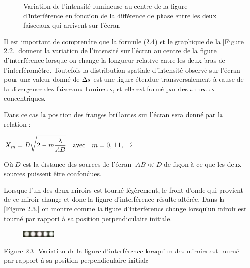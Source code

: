 \documentclass[11pt, openright]{book}
\begin{document}
					\begin{figure}[ht!]
						\centering
						\caption{Variation de l'intensité lumineuse au centre de la figure d'interférence en fonction de la différence de phase entre les deux faisceaux qui arrivent sur l'écran}

					\end{figure}

					Il est important de comprendre que la formule (2.4) et le graphique de la [Figure 2.2.] donnent la variation de l'intensité sur l'écran au centre de la figure d'interférence lorsque on change la longueur relative entre les deux bras de l'interféromètre. Toutefois la distribution spatiale d'intensité observé sur l'écran pour une valeur donné de $\displaystyle{\Delta s}$ est une figure étendue transversalement à cause de la divergence des faisceaux lumineux, et elle est formé par des anneaux concentriques.

					Dans ce cas la position des franges brillantes sur l'écran sera donné par la relation : \\\vspace{2mm}
					\centerline{$\displaystyle{X_m=D\sqrt{2-m\frac{\lambda}{AB}}\quad \text{avec}\quad m=0,\pm 1,\pm 2}$}

					Où $D$ est la distance des sources de l'écran, $AB\ll D$ de façon à ce que les deux sources puissent être confondues.

					Lorsque l'un des deux miroirs est tourné légèrement, le front d'onde qui provient de ce miroir change et donc la figure d'interférence résulte altérée. Dans la [Figure 2.3.] on montre comme la figure d'interférence change lorsqu'un miroir est tourné par rapport à sa position perpendiculaire initiale.

					\begin{figure}[ht!]
						\centering
						\includegraphics[width=0.15\textwidth,angle=90, origin=c]{./object/g3.jpg}	
					\end{figure}
					\vspace{-5.2cm}
					Figure 2.3. Variation de la figure d'interférence lorsqu'un des miroirs est tourné par rapport à sa position perpendiculaire initiale	
					
\end{document}
